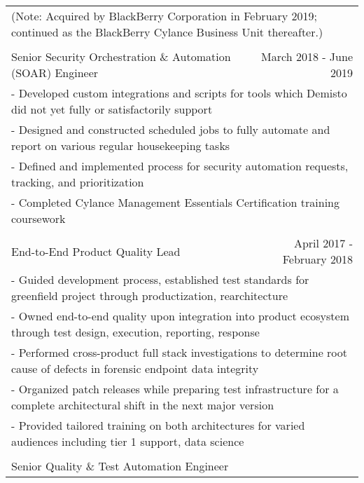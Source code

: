 \documentclass[letterpaper]{article}
\begin{document}
\begin{center}
\begin{tabular}{p{}p{}r}
				\multicolumn{3}{p{\textwidth}}{(Note: Acquired by BlackBerry Corporation in February 2019; continued as the BlackBerry Cylance Business Unit thereafter.)}
			\\
			\\
				\multicolumn{2}{p{0.5\textwidth}}{\quad Senior Security Orchestration \& Automation (SOAR) Engineer}
				&
				{March 2018 - June 2019 \quad\quad\quad\quad}
			\\
				\multicolumn{3}{p{\textwidth}}{\quad\quad - Developed custom integrations and scripts for tools which Demisto did not yet fully or satisfactorily support}
			\\
				\multicolumn{3}{p{\textwidth}}{\quad\quad - Designed and constructed scheduled jobs to fully automate and report on various regular housekeeping tasks}
			\\
				\multicolumn{3}{p{\textwidth}}{\quad\quad - Defined and implemented process for security automation requests, tracking, and prioritization}
			\\
				\multicolumn{3}{p{\textwidth}}{\quad\quad - Completed Cylance Management Essentials Certification training coursework}
			\\
		  \\		%
			  \multicolumn{2}{p{0.5\textwidth}}{\quad End-to-End Product Quality Lead}
			  &
			  {April 2017 - February 2018 \quad\quad\quad\quad}
		  \\
			  \multicolumn{3}{p{\textwidth}}{\quad\quad - Guided development process, established test standards for greenfield project through productization, rearchitecture} 
		  \\
			  \multicolumn{3}{p{\textwidth}}{\quad\quad - Owned end-to-end quality upon integration into product ecosystem through test design, execution, reporting, response} 
		  \\
			  \multicolumn{3}{p{\textwidth}}{\quad\quad - Performed cross-product full stack investigations to determine root cause of defects in forensic endpoint data integrity} 
		  \\
			  \multicolumn{3}{p{\textwidth}}{\quad\quad - Organized patch releases while preparing test infrastructure for a complete architectural shift in the next major version} 
		  \\
			  \multicolumn{3}{p{\textwidth}}{\quad\quad - Provided tailored training on both architectures for varied audiences including tier 1 support, data science}
		  \\
		  \\
			  \multicolumn{2}{p{0.5\textwidth}}{\quad Senior Quality \& Test Automation Engineer}

\end{tabular}
\end{center}
\end{document}
